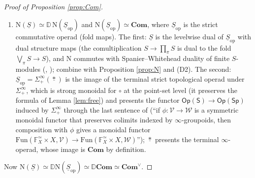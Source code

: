 \documentclass[11pt]{amsart}
\theoremstyle{definition}
\theoremstyle{remark}
\newcommand{\Sp}{\mathsf{Sp}}
\newcommand{\Op}{\mathsf{Op}}
\newcommand{\pt}{*}
\newcommand{\uS}{\underline{S}}
\newcommand{\Com}{\mathbf{Com}}
\newcommand{\Comv}{\mathbf{Com}^{\vee}}
\newcommand{\dual}{\mathbb{D}}
\newcommand{\Fin}{\mathbb{F}}
\newcommand{\Nfun}{\mathrm{N}}
\begin{document}
\begin{proof}[Proof of Proposition \ref{prop:Com}]
\begin{enumerate}[label=(D\arabic*),leftmargin=2.6em]
\item $\Nfun(\uS)\simeq\dual\,\Nfun(\uS_{\mathrm{op}})$ and $\Nfun(\uS_{\mathrm{op}})\simeq\Com$, where $\uS_{\mathrm{op}}$ is the strict commutative operad (fold maps). The first: $\uS$ is the levelwise dual of $\uS_{\mathrm{op}}$ with dual structure maps (the comultiplication $S\to\prod_\pi S$ is dual to the fold $\bigvee_\pi S\to S$), and $\Nfun$ commutes with Spanier--Whitehead duality of finite $S$-modules (\cite[III.7]{EKMM}, \cite[4.6.1]{HA}); combine with Proposition \ref{prop:N} and (D2). The second: $\uS_{\mathrm{op}}=\Sigma^\infty_+(\underline{\pt})$ is the image of the terminal strict topological operad under $\Sigma^\infty_+$, which is strong monoidal for $\circ$ at the point-set level (it preserves the formula of Lemma \ref{lem:free}) and presents the functor $\Op(\mathsf S)\to\Op(\Sp)$ induced by $\Sigma^\infty_+$ through the last sentence of \cite[Corollary 4.2.9]{Hau} (``if $\phi\colon\mathcal V\to\mathcal W$ is a symmetric monoidal functor that preserves colimits indexed by $\infty$-groupoids, then composition with $\phi$ gives a monoidal functor $\mathrm{Fun}(\Fin^\simeq_X\times X,\mathcal V)\to\mathrm{Fun}(\Fin^\simeq_X\times X,\mathcal W)$''); $\underline\pt$ presents the terminal $\infty$-operad, whose image is $\Com$ by definition.
\end{enumerate}
Now $\Nfun(\uS)\simeq\dual\Nfun(\uS_{\mathrm{op}})\simeq\dual\Com\simeq\Comv$.
\end{proof}
\end{document}
